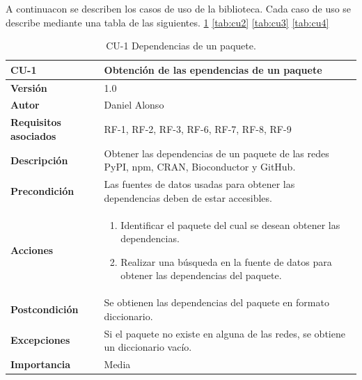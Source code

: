 A continuacon se describen los casos de uso de la biblioteca. Cada caso de uso se describe mediante una tabla de las siguientes. \ref{tab:cu1} \ref{tab:cu2} \ref{tab:cu3} \ref{tab:cu4}

\begin{table}[p]
	\centering
	\begin{tabularx}{\linewidth}{ p{} p{} }
		\toprule
		\textbf{CU-1}    & \textbf{Obtención de las ependencias de un paquete}\\
		\toprule
		\textbf{Versión}              & 1.0    \\
		\textbf{Autor}                & Daniel Alonso \\
		\textbf{Requisitos asociados} & RF-1, RF-2, RF-3, RF-6, RF-7, RF-8, RF-9 \\
		\textbf{Descripción}          & Obtener las dependencias de un paquete de las redes 
										PyPI, npm, CRAN, Bioconductor y GitHub. \\
		\textbf{Precondición}         & Las fuentes de datos usadas para obtener las dependencias 
										deben de estar accesibles. \\
		\textbf{Acciones}             &
		\begin{enumerate}
			\def\labelenumi{\arabic{enumi}.}
			\tightlist
			\item Identificar el paquete del cual se desean obtener las dependencias.
			\item Realizar una búsqueda en la fuente de datos para obtener las dependencias del paquete.
		\end{enumerate}\\
		\textbf{Postcondición}        & Se obtienen las dependencias del paquete en formato diccionario. \\
		\textbf{Excepciones}          & Si el paquete no existe en alguna de las redes, se obtiene un diccionario vacío.\\
		\textbf{Importancia}          & Media \\
		\bottomrule
	\end{tabularx}
	\caption{CU-1 Dependencias de un paquete.}
	\label{tab:cu1}
\end{table}

